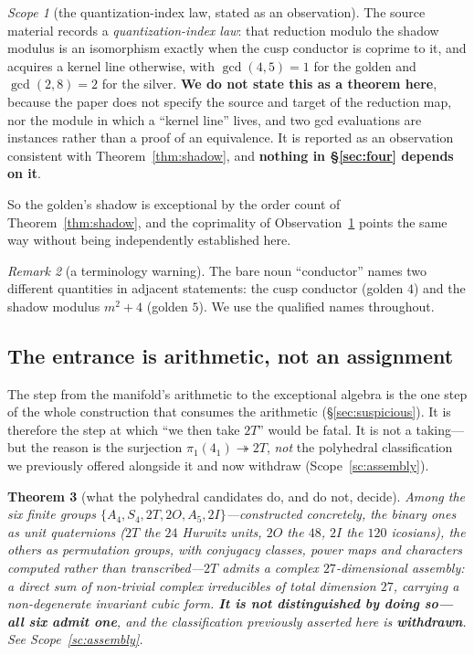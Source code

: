 \documentclass[11pt,reqno]{amsart}
\theoremstyle{plain}
\newtheorem{theorem}{Theorem}[section]
\theoremstyle{definition}
\theoremstyle{remark}
\newtheorem{scope}[theorem]{Scope}
\newtheorem{remark}[theorem]{Remark}
\begin{document}
\begin{scope}[the quantization-index law, stated as an observation]\label{obs:qil}
The source material records a \emph{quantization-index law}: that reduction modulo the
shadow modulus is an isomorphism exactly when the cusp conductor is coprime to it, and
acquires a kernel line otherwise, with $\gcd(4,5)=1$ for the golden and $\gcd(2,8)=2$
for the silver. \textbf{We do not state this as a theorem here}, because the paper does
not specify the source and target of the reduction map, nor the module in which a
``kernel line'' lives, and two gcd evaluations are instances rather than a proof of an
equivalence. It is reported as an observation consistent with
Theorem~\ref{thm:shadow}, and \textbf{nothing in \S\ref{sec:four} depends on it}.
\end{scope}

So the golden's shadow is exceptional by the order count of
Theorem~\ref{thm:shadow}, and the coprimality of Observation~\ref{obs:qil} points the
same way without being independently established here.

\begin{remark}[a terminology warning]
The bare noun ``conductor'' names two different quantities in adjacent statements: the
cusp conductor (golden $4$) and the shadow modulus $m^2+4$ (golden $5$). We use the
qualified names throughout.
\end{remark}

\subsection{The entrance is arithmetic, not an assignment}\label{sec:classification}

The step from the manifold's arithmetic to the exceptional algebra is the one step of
the whole construction that consumes the arithmetic (\S\ref{sec:suspicious}). It is
therefore the step at which ``we then take $2T$'' would be fatal. It is not a taking---but
the reason is the surjection $\pi_1(4_1)\twoheadrightarrow2T$, \emph{not} the polyhedral
classification we previously offered alongside it and now withdraw
(Scope~\ref{sc:assembly}).

\begin{theorem}[what the polyhedral candidates do, and do not, decide]\label{thm:classify}
Among the six finite groups $\{A_4,S_4,2T,2O,A_5,2I\}$---constructed
concretely, the binary ones as unit quaternions ($2T$ the $24$ Hurwitz units, $2O$ the
$48$, $2I$ the $120$ icosians), the others as permutation groups, with conjugacy
classes, power maps and characters computed rather than transcribed---$2T$ admits a complex
$27$-dimensional \emph{assembly}: a direct sum of non-trivial complex irreducibles of total
dimension $27$, carrying a non-degenerate invariant cubic form. \textbf{It is not
distinguished by doing so---all six admit one}, and the classification previously asserted
here is \textbf{withdrawn}. See Scope~\ref{sc:assembly}.
\end{theorem}
\end{document}
